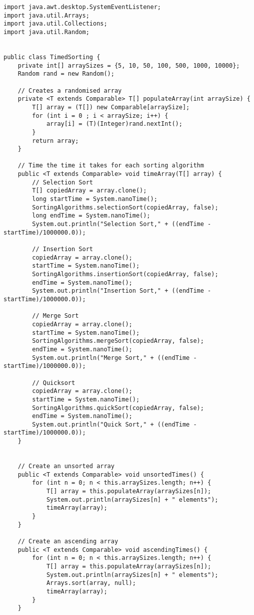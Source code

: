 \documentclass[oneside, a4paper]{article}
\begin{document}
\begin{lstlisting}
import java.awt.desktop.SystemEventListener;
import java.util.Arrays; 
import java.util.Collections;
import java.util.Random;


public class TimedSorting {
    private int[] arraySizes = {5, 10, 50, 100, 500, 1000, 10000};
    Random rand = new Random();

    // Creates a randomised array
    private <T extends Comparable> T[] populateArray(int arraySize) {
        T[] array = (T[]) new Comparable[arraySize];
        for (int i = 0 ; i < arraySize; i++) {
            array[i] = (T)(Integer)rand.nextInt();
        }
        return array;
    }

    // Time the time it takes for each sorting algorithm
    public <T extends Comparable> void timeArray(T[] array) {
        // Selection Sort
        T[] copiedArray = array.clone();
        long startTime = System.nanoTime();
        SortingAlgorithms.selectionSort(copiedArray, false);
        long endTime = System.nanoTime();
        System.out.println("Selection Sort," + ((endTime - startTime)/1000000.0));

        // Insertion Sort
        copiedArray = array.clone();
        startTime = System.nanoTime();
        SortingAlgorithms.insertionSort(copiedArray, false);
        endTime = System.nanoTime();
        System.out.println("Insertion Sort," + ((endTime - startTime)/1000000.0));

        // Merge Sort
        copiedArray = array.clone();
        startTime = System.nanoTime();
        SortingAlgorithms.mergeSort(copiedArray, false);
        endTime = System.nanoTime();
        System.out.println("Merge Sort," + ((endTime - startTime)/1000000.0));

        // Quicksort
        copiedArray = array.clone();
        startTime = System.nanoTime();
        SortingAlgorithms.quickSort(copiedArray, false);
        endTime = System.nanoTime();
        System.out.println("Quick Sort," + ((endTime - startTime)/1000000.0));
    }


    // Create an unsorted array
    public <T extends Comparable> void unsortedTimes() {
        for (int n = 0; n < this.arraySizes.length; n++) {
            T[] array = this.populateArray(arraySizes[n]);
            System.out.println(arraySizes[n] + " elements");
            timeArray(array);
        }
    }

    // Create an ascending array
    public <T extends Comparable> void ascendingTimes() {
        for (int n = 0; n < this.arraySizes.length; n++) {
            T[] array = this.populateArray(arraySizes[n]);
            System.out.println(arraySizes[n] + " elements");
            Arrays.sort(array, null);
            timeArray(array);
        }
    }


\end{lstlisting}
\end{document}
